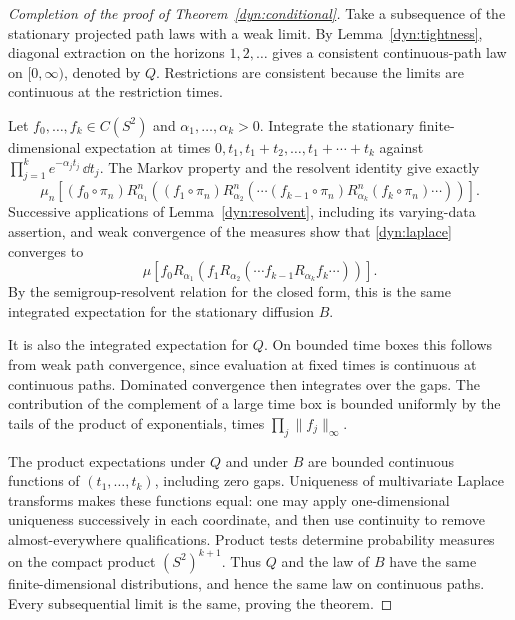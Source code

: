 \begin{proof}[Completion of the proof of Theorem~\ref{dyn:conditional}]
Take a subsequence of the stationary projected path laws with a weak
limit.  By Lemma~\ref{dyn:tightness}, diagonal extraction on the
horizons $1,2,\ldots$ gives a consistent continuous-path law on
$[0,\infty)$, denoted by $Q$.  Restrictions are consistent because
the limits are continuous at the restriction times.

Let $f_0,\ldots,f_k\in C(S^2)$ and $\alpha_1,\ldots,\alpha_k>0$.
Integrate the stationary finite-dimensional expectation at times
$0,t_1,t_1+t_2,\ldots,t_1+\cdots+t_k$ against
$\prod_{j=1}^k e^{-\alpha_jt_j}\,\dd t_j$.  The Markov property
and the resolvent identity give exactly
\begin{equation}\label{dyn:laplace}
 \mu_n\!\left[
  (f_0\circ\pi_n)R^n_{\alpha_1}
  \left((f_1\circ\pi_n)R^n_{\alpha_2}
    \left(\cdots(f_{k-1}\circ\pi_n)
                R^n_{\alpha_k}(f_k\circ\pi_n)\cdots\right)\right)
 \right].
\end{equation}
Successive applications of Lemma~\ref{dyn:resolvent}, including its
varying-data assertion, and weak convergence of the measures show
that \eqref{dyn:laplace} converges to
\[
 \mu\!\left[f_0R_{\alpha_1}
       \left(f_1R_{\alpha_2}
          \left(\cdots f_{k-1}R_{\alpha_k}f_k\cdots\right)\right)
       \right].
\]
By the semigroup-resolvent relation for the closed form, this is the
same integrated expectation for the stationary diffusion $B$.

It is also the integrated expectation for $Q$.  On bounded time
boxes this follows from weak path convergence, since evaluation at
fixed times is continuous at continuous paths.  Dominated
convergence then integrates over the gaps.  The contribution of
the complement of a large time box is bounded uniformly by the
tails of the product of exponentials, times
$\prod_j\|f_j\|_\infty$.

The product expectations under $Q$ and under $B$ are bounded
continuous functions of $(t_1,\ldots,t_k)$, including zero gaps.
Uniqueness of multivariate Laplace transforms makes these
functions equal: one may apply one-dimensional uniqueness
successively in each coordinate, and then use continuity to
remove almost-everywhere qualifications.  Product tests determine
probability measures on the compact product $(S^2)^{k+1}$.
Thus $Q$ and the law of $B$ have the same finite-dimensional
distributions, and hence the same law on continuous paths.
Every subsequential limit is the same, proving the theorem.
\end{proof}

